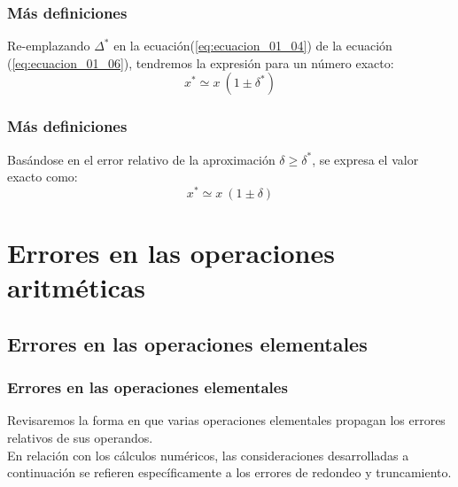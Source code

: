 \begin{frame}
\frametitle{Más definiciones}
Re-emplazando $\Delta^{*}$ en la ecuación(\ref{eq:ecuacion_01_04}) de la ecuación (\ref{eq:ecuacion_01_06}), tendremos la expresión para un número exacto:
\begin{equation}
x^{*} \simeq x \: (1 \pm \delta^{*})
\label{eq:ecuacion_01_07}
\end{equation}
\end{frame}
\begin{frame}
\frametitle{Más definiciones}
Basándose en el error relativo de la aproximación $\delta \geq \delta^{*}$, se expresa el valor exacto como:
\begin{equation}
x^{*} \simeq x \: (1 \pm \delta)
\label{eq:ecuacion_01_08}
\end{equation}
\end{frame}
\section{Errores en las operaciones aritméticas}
\subsection{Errores en las operaciones elementales}
\begin{frame}
\frametitle{Errores en las operaciones elementales}
Revisaremos la forma en que varias operaciones elementales propagan los errores relativos de sus operandos.
\\
\bigskip
En relación con los cálculos numéricos, las consideraciones desarrolladas a continuación se refieren específicamente a los errores de redondeo y truncamiento.
\end{frame}
